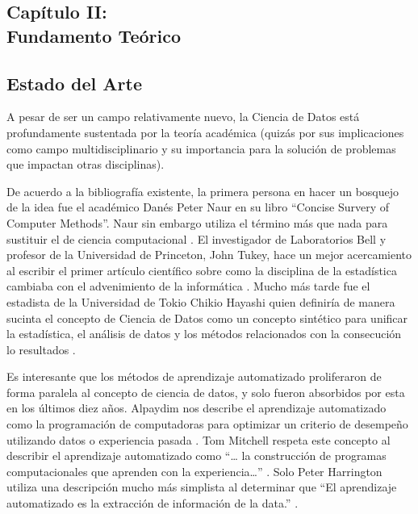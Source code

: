 \begin{spacing}{1.5}
\setcounter{chapter}{1}
\chapter{Capítulo II: \\Fundamento Teórico}
\thispagestyle{empty}

\section{Estado del Arte}
A pesar de ser un campo relativamente nuevo, la Ciencia de Datos está profundamente sustentada por la teoría académica (quizás por sus implicaciones como campo multidisciplinario y su importancia para la solución de problemas que impactan otras disciplinas).

De acuerdo a la bibliografía existente, la primera persona en hacer un bosquejo de la idea fue el académico Danés Peter Naur en su libro “Concise Survery of Computer Methods”. Naur sin embargo utiliza el término más que nada para sustituir el de ciencia computacional \cite{naur}. El investigador de Laboratorios Bell y profesor de la Universidad de Princeton, John Tukey, hace un mejor acercamiento al escribir el primer artículo científico sobre como la disciplina de la estadística cambiaba con el advenimiento de la informática \cite{tukey}. Mucho más tarde fue el estadista de la Universidad de Tokio Chikio Hayashi quien definiría de manera sucinta el concepto de Ciencia de Datos como un concepto sintético para unificar la estadística, el análisis de datos y los métodos relacionados con la consecución lo resultados \cite{hayashi}.

Es interesante que los métodos de aprendizaje automatizado proliferaron de forma paralela al concepto de ciencia de datos, y solo fueron absorbidos por esta en los últimos diez años. Alpaydim nos describe el aprendizaje automatizado como la programación de computadoras para optimizar un criterio de desempeño utilizando datos o experiencia pasada \cite{alpaydin}. Tom Mitchell respeta este concepto al describir el aprendizaje automatizado como “… la construcción de programas computacionales que aprenden con la experiencia…” \cite[pag. XV]{mitchell}. Solo Peter Harrington utiliza una descripción mucho más simplista al determinar que “El aprendizaje automatizado es la extracción de información de la data.” \cite[pag. 5]{harrington}.


\end{spacing}
